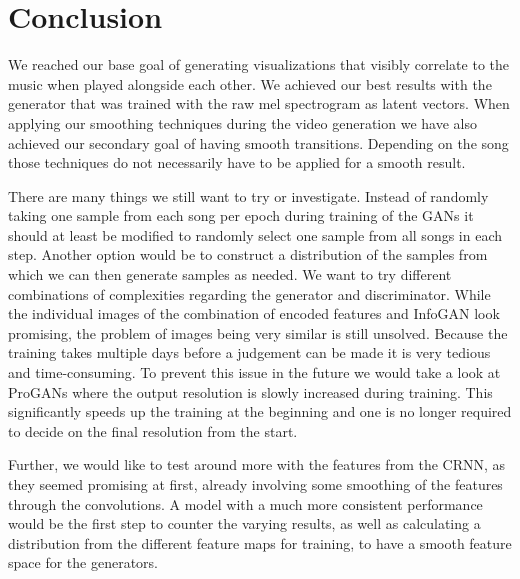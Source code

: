 \chapter{Conclusion}

    We reached our base goal of generating visualizations that visibly correlate to the music when played alongside each other. We achieved our best results with the generator that was trained with the raw mel spectrogram as latent vectors. When applying our smoothing techniques during the video generation we have also achieved our secondary goal of having smooth transitions. Depending on the song those techniques do not necessarily have to be applied for a smooth result.

    There are many things we still want to try or investigate. Instead of randomly taking one sample from each song per epoch during training of the GANs it should at least be modified to randomly select one sample from all songs in each step. Another option would be to construct a distribution of the samples from which we can then generate samples as needed. We want to try different combinations of complexities regarding the generator and discriminator. While the individual images of the combination of encoded features and InfoGAN look promising, the problem of images being very similar is still unsolved. Because the training takes multiple days before a judgement can be made it is very tedious and time-consuming. To prevent this issue in the future we would take a look at ProGANs where the output resolution is slowly increased during training. This significantly speeds up the training at the beginning and one is no longer required to decide on the final resolution from the start.

    Further, we would like to test around more with the features from the CRNN, as they seemed promising at first, already involving some smoothing of the features through the convolutions. A model with a much more consistent performance would be the first step to counter the varying results, as well as calculating a distribution from the different feature maps for training, to have a smooth feature space for the generators.